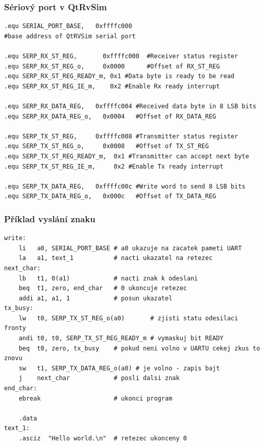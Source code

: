\documentclass{beamer}
\begin{document}
\begin{frame}[fragile]
\frametitle{Sériový port v QtRvSim}

\begin{verbatim}
.equ SERIAL_PORT_BASE,   0xffffc000 
#base address of QtRVSim serial port

.equ SERP_RX_ST_REG,       0xffffc000  #Receiver status register
.equ SERP_RX_ST_REG_o,     0x0000      #Offset of RX_ST_REG
.equ SERP_RX_ST_REG_READY_m, 0x1 #Data byte is ready to be read
.equ SERP_RX_ST_REG_IE_m,    0x2 #Enable Rx ready interrupt

.equ SERP_RX_DATA_REG,   0xffffc004 #Received data byte in 8 LSB bits
.equ SERP_RX_DATA_REG_o,   0x0004   #Offset of RX_DATA_REG

.equ SERP_TX_ST_REG,     0xffffc008 #Transmitter status register
.equ SERP_TX_ST_REG_o,     0x0008   #Offset of TX_ST_REG
.equ SERP_TX_ST_REG_READY_m,  0x1 #Transmitter can accept next byte
.equ SERP_TX_ST_REG_IE_m,     0x2 #Enable Tx ready interrupt

.equ SERP_TX_DATA_REG,   0xffffc00c #Write word to send 8 LSB bits
.equ SERP_TX_DATA_REG_o,   0x000c   #Offset of TX_DATA_REG
\end{verbatim}
\end{frame}

\begin{frame}[fragile]
\frametitle{Příklad vyslání znaku}

\begin{verbatim}
write:
    li   a0, SERIAL_PORT_BASE # a0 ukazuje na zacatek pameti UART
    la   a1, text_1           # nacti ukazatel na retezec
next_char:
    lb   t1, 0(a1)            # nacti znak k odeslani
    beq  t1, zero, end_char   # 0 ukoncuje retezec
    addi a1, a1, 1            # posun ukazatel
tx_busy:
    lw   t0, SERP_TX_ST_REG_o(a0)       # zjisti statu odesilaci fronty
    andi t0, t0, SERP_TX_ST_REG_READY_m # vymaskuj bit READY
    beq  t0, zero, tx_busy    # pokud neni volno v UARTU cekej zkus to znovu
    sw   t1, SERP_TX_DATA_REG_o(a0) # je volno - zapis bajt
    j    next_char            # posli dalsi znak
end_char:
    ebreak                    # ukonci program

    .data
text_1:
    .asciz  "Hello world.\n"  # retezec ukonceny 0
\end{verbatim}

\end{frame}
\end{document}

